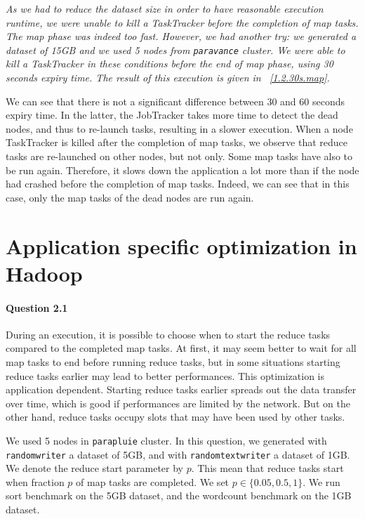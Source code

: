 \documentclass[a4paper]{article}
\begin{document}
\textit{As we had to reduce the dataset size in order to have reasonable execution runtime,
we were unable to kill a TaskTracker before the completion of map tasks.
The map phase was indeed too fast.
However, we had another try: we generated a dataset of 15GB and we used 5 nodes from \texttt{paravance} cluster.
We were able to kill a TaskTracker in these conditions before the end of map phase, using 30 seconds expiry time.
The result of this execution is given in \figurename~\ref{1.2.30s.map}.}

We can see that there is not a significant difference between 30 and 60 seconds expiry time.
In the latter, the JobTracker takes more time to detect the dead nodes, and thus to re-launch tasks, resulting in a slower execution.
When a node TaskTracker is killed after the completion of map tasks,
we observe that reduce tasks are re-launched on other nodes, but not only.
Some map tasks have also to be run again.
Therefore, it slows down the application a lot more than if the node had crashed before the completion of map tasks.
Indeed, we can see that in this case, only the map tasks of the dead
nodes are run again.


\section{Application specific optimization in Hadoop}

\paragraph{Question 2.1}

During an execution, it is possible to choose when to start the reduce tasks compared to the completed map tasks.
At first, it may seem better to wait for all map tasks to end before running reduce tasks,
but in some situations starting reduce tasks earlier may lead to better performances.
This optimization is application dependent.
Starting reduce tasks earlier spreads out the data transfer over time, which is good if performances are limited by the network.
But on the other hand, reduce tasks occupy slots that may have been used by other tasks.

We used 5 nodes in \texttt{parapluie} cluster.
In this question, we generated with \texttt{randomwriter} a dataset of 5GB, and with \texttt{randomtextwriter} a dataset of 1GB.
We denote the reduce start parameter by $p$.
This mean that reduce tasks start when fraction $p$ of map tasks are completed.
We set $p \in \lbrace 0.05, 0.5, 1 \rbrace$.
We run sort benchmark on the 5GB dataset, and the wordcount benchmark on the 1GB dataset.
\end{document}
